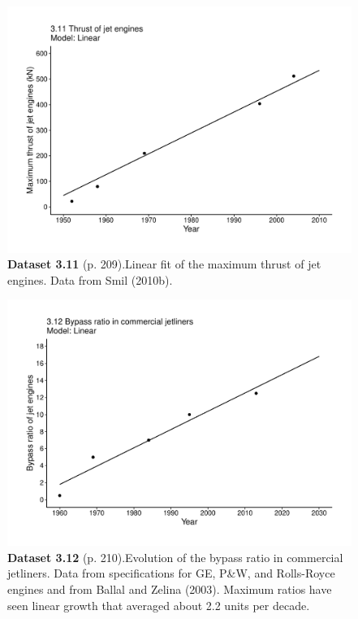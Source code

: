 \documentclass[aps,rmp,preprint,superscriptaddress,10pt,onecolumn]{article}
\begin{document}
\clearpage
\begin{figure}[h]
\includegraphics[width=\textwidth]{output/figs-ggplot/3.11.pdf}
\caption*{\textbf{Dataset 3.11} (p. 209).Linear fit of the maximum thrust of jet engines. Data from Smil (2010b).}
\end{figure}
	
\clearpage
\begin{figure}[h]
\includegraphics[width=\textwidth]{output/figs-ggplot/3.12.pdf}
\caption*{\textbf{Dataset 3.12} (p. 210).Evolution of the bypass ratio in commercial jetliners. Data from specifications for GE, P\&W, and Rolls-Royce engines and from Ballal and Zelina (2003). Maximum ratios have seen linear growth that averaged about 2.2 units per decade.}
\end{figure}
	
\end{document}
